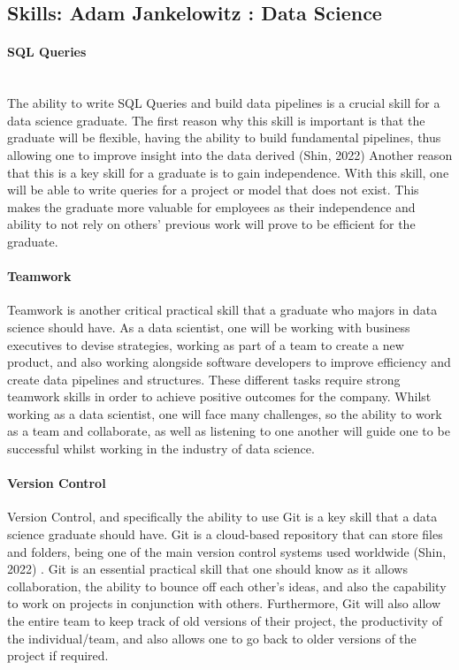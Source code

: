 \documentclass[a4paper, 11pt]{report}
\begin{document}
\subsection{Skills: Adam Jankelowitz : Data Science}

\paragraph{SQL Queries}
\\The ability to write SQL Queries and build data pipelines is a crucial skill for a data science graduate. The first reason why this skill is important is that the graduate will be flexible, having the ability to build fundamental pipelines, thus allowing one to improve insight into the data derived (Shin, 2022) Another reason that this is a key skill for a graduate is to gain independence. With this skill, one will be able to write queries for a project or model that does not exist. This makes the graduate more valuable for employees as their independence and ability to not rely on others’ previous work will prove to be efficient for the graduate.

\paragraph{Teamwork} Teamwork is another critical practical skill that a graduate who majors in data science should have. As a data scientist, one will be working with business executives to devise strategies, working as part of a team to create a new product, and also working alongside software developers to improve efficiency and create data pipelines and structures. These different tasks require strong teamwork skills in order to achieve positive outcomes for the company. Whilst working as a data scientist, one will face many challenges, so the ability to work as a team and collaborate, as well as listening to one another will guide one to be successful whilst working in the industry of data science. 

\paragraph{Version Control} Version Control, and specifically the ability to use Git is a key skill that a data science graduate should have. Git is a cloud-based repository that can store files and folders, being one of the main version control systems used worldwide (Shin, 2022)
. Git is an essential practical skill that one should know as it allows collaboration, the ability to bounce off each other’s ideas, and also the capability to work on projects in conjunction with others. Furthermore, Git will also allow the entire team to keep track of old versions of their project, the productivity of the individual/team, and also allows one to go back to older versions of the project if required. 
\end{document}
